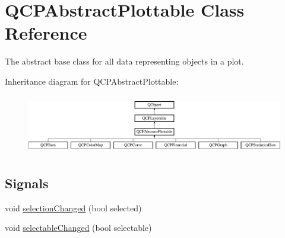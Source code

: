 \hypertarget{class_q_c_p_abstract_plottable}{}\section{Q\+C\+P\+Abstract\+Plottable Class Reference}
\label{class_q_c_p_abstract_plottable}


The abstract base class for all data representing objects in a plot.  


Inheritance diagram for Q\+C\+P\+Abstract\+Plottable\+:\begin{figure}[H]
\begin{center}
\leavevmode
\includegraphics[height=2.629108cm]{class_q_c_p_abstract_plottable}
\end{center}
\end{figure}
\subsection*{Signals}
\begin{DoxyCompactItemize}
\item 
void \mbox{\hyperlink{class_q_c_p_abstract_plottable_a3af66432b1dca93b28e00e78a8c7c1d9}{selection\+Changed}} (bool selected)
\item 
void \mbox{\hyperlink{class_q_c_p_abstract_plottable_a0059caa3f3581f3959660fef8cbb71c4}{selectable\+Changed}} (bool selectable)
\end{DoxyCompactItemize}

